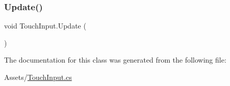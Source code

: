 \subsubsection{\texorpdfstring{Update()}{Update()}}
{\footnotesize\ttfamily void Touch\+Input.\+Update (\begin{DoxyParamCaption}{ }\end{DoxyParamCaption})\hspace{0.3cm}{\ttfamily [private]}}



The documentation for this class was generated from the following file\+:\begin{DoxyCompactItemize}
\item 
Assets/\hyperlink{_touch_input_8cs}{Touch\+Input.\+cs}\end{DoxyCompactItemize}
